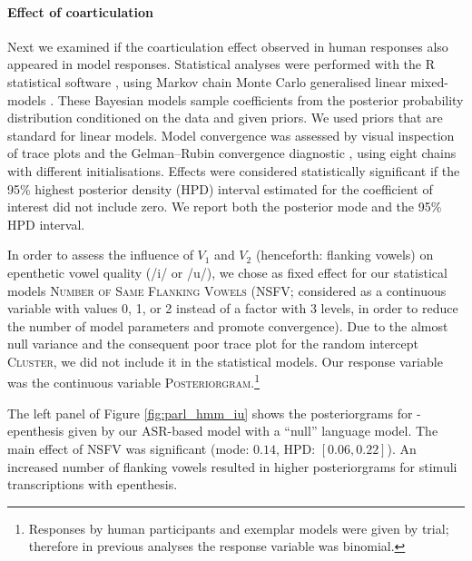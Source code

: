 {\paragraph{Effect of coarticulation}

Next we examined if the coarticulation effect observed in human responses also appeared in model responses. Statistical analyses were performed with the R statistical software \cite{R-base}, using Markov chain Monte Carlo generalised linear mixed-models \cite{R-MCMCglmm, R-coda}. These Bayesian models sample coefficients from the posterior probability distribution conditioned on the data and given priors. We used priors that are standard for linear models. Model convergence was assessed by visual inspection of trace plots and the Gelman–Rubin convergence diagnostic \cite{gelman1992}, using eight chains with different initialisations. Effects were considered statistically significant if the 95\% highest posterior density (HPD) interval estimated for the coefficient of interest did not include zero. We report both the posterior mode and the 95\% HPD interval.  

In order to assess the influence of $V_{1}$ and $V_{2}$ (henceforth: flanking vowels) on epenthetic vowel quality (/i/ or /u/), we chose as fixed effect for our statistical models \textsc{Number of Same Flanking Vowels} (\textsc{NSFV}; considered as a continuous variable with values 0, 1, or 2 instead of a factor with 3 levels, in order to reduce the number of model parameters and promote convergence). Due to the almost null variance and the consequent poor trace plot for the random intercept \textsc{Cluster}, we did not include it in the statistical models. Our response variable was the continuous variable \textsc{Posteriorgram}.\footnote{Responses by human participants and exemplar models were given by trial; therefore in previous analyses the response variable was binomial.}

The left panel of Figure \ref{fig:parl_hmm_iu} shows the posteriorgrams for -epenthesis given by our ASR-based model with a ``null'' language model.
The main effect of \textsc{NSFV} was significant (mode: $0.14$, HPD: $[0.06, 0.22]$). An increased number of  flanking vowels resulted in higher posteriorgrams for stimuli transcriptions with  epenthesis.

}
